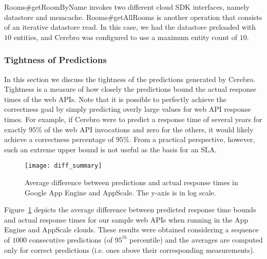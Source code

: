 Rooms\#getRoomByName
invokes two different cloud SDK interfaces, namely datastore and memcache.
Rooms\#get\-AllRooms is another operation that consists of an iterative
datastore read. In this case, we had the datastore preloaded with $10$ entities,
and Cerebro was configured to use a maximum entity count of $10$. 

\subsubsection{Tightness of Predictions}

In this section we discuss the tightness of the predictions generated by Cerebro. 
Tightness is a measure of how closely the predictions
bound the actual response times of the web APIs. 
Note that it is possible to perfectly achieve the correctness goal
by simply predicting overly large values for web API response times. For example, if Cerebro were to
predict a response time of several years for exactly $95\%$ of the web API
invocations and zero for the others, it would likely
achieve a correctness percentage of $95\%$.  From a practical perspective,
however, such an extreme upper bound is not useful as the basis for an SLA. 

\begin{figure}
\centering
\texttt{[image: diff\_summary]}
\caption{Average difference between predictions and actual response times in
Google App Engine and AppScale. The y-axis is in log scale.}
\label{fig:diff_summary}
\vspace{-0.2in}
\end{figure}

Figure~\ref{fig:diff_summary} depicts the average difference between predicted
response time bounds and actual response times for
our sample web APIs when running in the App Engine and AppScale clouds. 
These results were obtained considering a sequence of $1000$ 
consecutive predictions (of $95^{th}$ percentile) and the averages are
computed only for correct predictions (i.e. ones above their corresponding
measurements).


